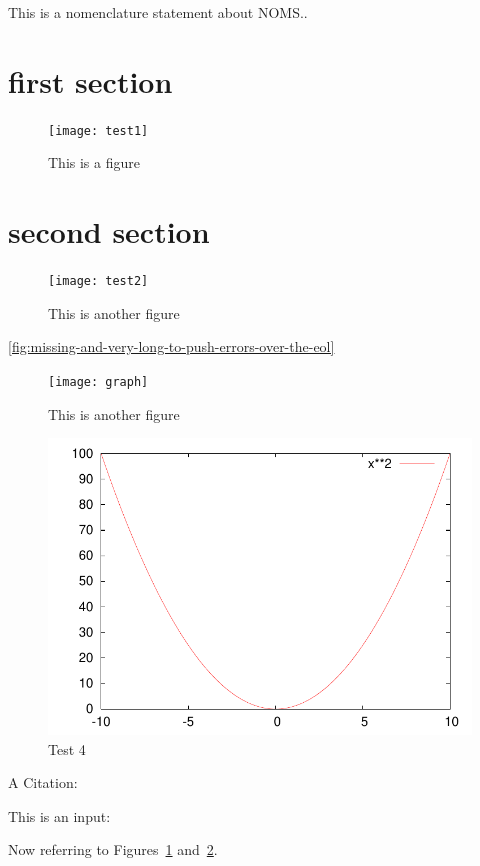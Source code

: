 \documentclass[
    letterpaper %
]{article}
\begin{document}
This is a nomenclature statement about NOMS..

\tableofcontents
\listoffigures

\section{first section}

\printglossary

\nocite{testentry3}

\begin{figure}
\centering
    \texttt{[image: test1]}
\caption{This is a figure}
\label{fig:test1}
\end{figure}

\section{second section}

\begin{figure}
\centering
    \texttt{[image: test2]}
\caption{This is another figure}
\label{fig:test2}
\end{figure}

\ref{fig:missing-and-very-long-to-push-errors-over-the-eol}

\begin{figure}
\centering
    \texttt{[image: graph]}
\caption{This is another figure}
\label{fig:test3}
\end{figure}

\begin{figure}
\centering
    \includegraphics[width=\textwidth]{test4}
\caption{Test 4}
\label{fig:test4}
\end{figure}

A Citation: \cite{testentry}

This is an input: {}




Now referring to Figures~\ref{fig:test1} and~\ref{fig:test2}.
\end{document}
